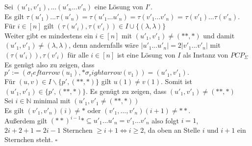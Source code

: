 \begin{lemma}{}
    Sei $(u'_1,v'_1),...(u'_n...v'_n)$ eine Lösung von $I'$. \\
    Es gilt $\tau(u'_1)...\tau(u'_n) = \tau(u'_1...u'_n) = \tau(v'_1...v'_n)$ = $\tau(v'_1)...\tau(v'_n)$. \\
    Für $i \in [n]$ gilt $(\tau(u'_i), \tau(v'_i)) \in I \cup \{(\lambda, \lambda)\}$ \\

    Weiter gibt es mindestens ein $i \in [n]$ mit $(u'_1,v'_1) \neq (**,*)$ und damit $(u'_1,v'_1) \neq
    (\lambda, \lambda)$, denn andernfalls wäre $|u'_1...u'_n| = 2|v'_1...v'_n|$ mit $(\tau(u'_i)), \tau(v'_i)$ für alle $i \in [n]$ 
    ist eine Lösung von $I$ als Instanz von $PCP_\Sigma$ \\

    Es genügt also zu zeigen, dass $p' := (\sigma_leftarrow(u_1),*\sigma_rightarrow(v_1)) =(u'_1, v'_1). $\\
    Für $(u,v) \in I \backslash \{p',(**,*)\}$ gilt $u(1) \neq v(1)$. Somit ist $(u'_1, v'_1) \in \{p',(**,*)\}$.
    Es genügt zu zeigen, dass $(u'_1,v'_1) \neq (**,*)$ \\

    Sei $i \in \mathbb{N}$ minimal mit $(u'_1, v'_1 \neq (**,*))$ \\
    Es gilt $(v'_1,v'_n)(i) \neq *$ oder $(v'_1,...,v'_n)(i+1) \neq **$. \\
    Außerdem gilt $(**)^{i-1} * \subseteq u'_1 ... u'_n = v'_1 ... v'_n$ also folgt $i=1$,
    $2i+2+1 = 2i-1$ Sternchen $\geq i+1 \Leftrightarrow i \geq 2$, da oben an Stelle $i$ und $i+1$ ein Sternchen steht. $\square$

\end{lemma}